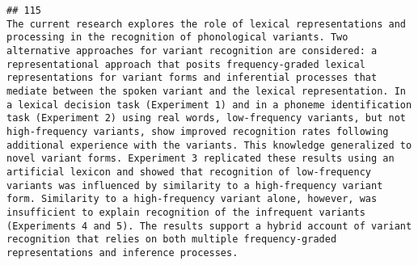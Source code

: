 \documentclass[
  english,
  man]{apa6}
\begin{document}
\begin{verbatim}
## 115                                                                                                                                                                                                                                                                                                                                                                                                                                                                                                                                                                                                                                                                                                                                                                                                                                                                                                                                                                                                                                                                                                                                                                                                                                                                                                                                                                                                                                                          The current research explores the role of lexical representations and processing in the recognition of phonological variants. Two alternative approaches for variant recognition are considered: a representational approach that posits frequency-graded lexical representations for variant forms and inferential processes that mediate between the spoken variant and the lexical representation. In a lexical decision task (Experiment 1) and in a phoneme identification task (Experiment 2) using real words, low-frequency variants, but not high-frequency variants, show improved recognition rates following additional experience with the variants. This knowledge generalized to novel variant forms. Experiment 3 replicated these results using an artificial lexicon and showed that recognition of low-frequency variants was influenced by similarity to a high-frequency variant form. Similarity to a high-frequency variant alone, however, was insufficient to explain recognition of the infrequent variants (Experiments 4 and 5). The results support a hybrid account of variant recognition that relies on both multiple frequency-graded representations and inference processes.

\end{verbatim}
\end{document}
